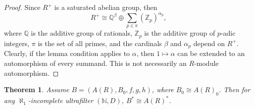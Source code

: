 \documentclass{article}
\newtheorem{theorem}{Theorem}[section]
\theoremstyle{remark}
\def\N{{\mathbb{N}}}
\def\Z{{\mathbb{Z}}}
\def\Q{{\mathbb{Q}}}
\begin{document}
\begin{proof} Since $R^+$ is a saturated abelian group, then $$\displaystyle  R^+\cong \Q^\beta \oplus \sum_{p\in \pi} (\Z_p)^{\alpha_p},$$where $\Q$ is the additive group of rationals, $\Z_p$ is the additive group of $p$-adic integers, $\pi$ is the set of all primes, and the cardinals $\beta$ and $\alpha_p$ depend on $R^+$. Clearly, if the lemma condition applies to $\alpha$, then $1\mapsto \alpha$ can be extended to an automorphism of every summand. This is not necessarily an $R$-module automorphism.\end{proof} 

\begin{theorem} Assume $B=(A(R),B_0,f,g,h)$, where $B_0\cong A(R)_0$. Then for any $\aleph_1$-incomplete ultrafilter $(\N,D)$, $B^*\cong A(R)^*$.    
\end{theorem}
\end{document}
